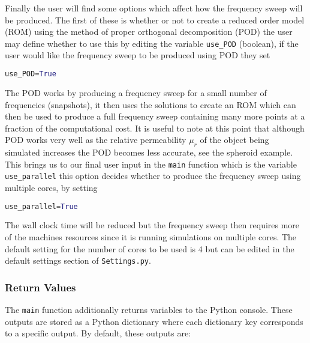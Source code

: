 \noindent
Finally the user will find some options which affect how the frequency sweep will be produced. The first of these is whether or not to create a reduced order model (ROM) using the method of proper orthogonal decomposition (POD) the user may define whether to use this by editing the variable \texttt{use\_POD} (boolean), if the user would like the frequency sweep to be produced using POD they set
\begin{lstlisting}[language=Python]
use_POD=True
\end{lstlisting}
\noindent
The POD works by producing a frequency sweep for a small number of frequencies (snapshots), it then uses the solutions to create an ROM which can then be used to produce a full frequency sweep containing many more points at a fraction of the computational cost. It is useful to note at this point that although POD works very well as the relative permeability $\mu_r$ of the object being simulated increases the POD becomes less accurate, see the spheroid example. This brings us to our final user input in the \texttt{main} function which is the variable \texttt{use\_parallel} this option decides whether to produce the frequency sweep using multiple cores, by setting
\begin{lstlisting}[language=Python]
use_parallel=True
\end{lstlisting}
\noindent
The wall clock time will be reduced but the frequency sweep then requires more of the machines resources since it is running simulations on multiple cores. The default setting for the number of cores to be used is 4 but can be edited in the default settings section of \texttt{Settings.py}.

\subsubsection{Return Values}
The \texttt{main} function additionally returns variables to the Python console. These outputs are stored as a Python dictionary where each dictionary key corresponds to a specific output. By default, these outputs are:


